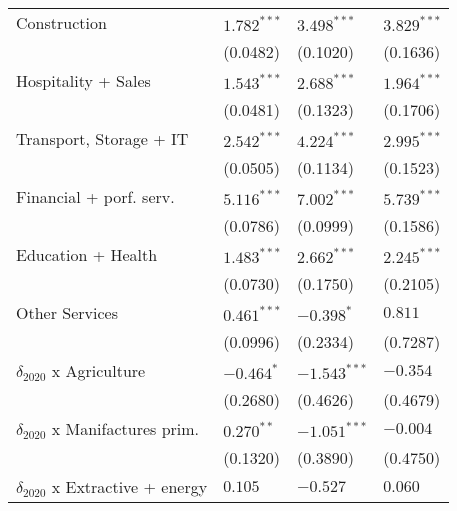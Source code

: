 \begin{tabular}{llll}
Construction                                       &      $1.782^{***}$ &      $3.498^{***}$ &      $3.829^{***}$ \\
                                                   &           (0.0482) &           (0.1020) &           (0.1636) \\
Hospitality + Sales                                &      $1.543^{***}$ &      $2.688^{***}$ &      $1.964^{***}$ \\
                                                   &           (0.0481) &           (0.1323) &           (0.1706) \\
Transport, Storage + IT                            &      $2.542^{***}$ &      $4.224^{***}$ &      $2.995^{***}$ \\
                                                   &           (0.0505) &           (0.1134) &           (0.1523) \\
Financial + porf. serv.                            &      $5.116^{***}$ &      $7.002^{***}$ &      $5.739^{***}$ \\
                                                   &           (0.0786) &           (0.0999) &           (0.1586) \\
Education + Health                                 &      $1.483^{***}$ &      $2.662^{***}$ &      $2.245^{***}$ \\
                                                   &           (0.0730) &           (0.1750) &           (0.2105) \\
Other Services                                     &      $0.461^{***}$ &         $-0.398^*$ &            $0.811$ \\
                                                   &           (0.0996) &           (0.2334) &           (0.7287) \\
$\delta_{2020}$ x Agriculture                      &         $-0.464^*$ &     $-1.543^{***}$ &           $-0.354$ \\
                                                   &           (0.2680) &           (0.4626) &           (0.4679) \\
$\delta_{2020}$ x Manifactures prim.               &       $0.270^{**}$ &     $-1.051^{***}$ &           $-0.004$ \\
                                                   &           (0.1320) &           (0.3890) &           (0.4750) \\
$\delta_{2020}$ x Extractive + energy              &            $0.105$ &           $-0.527$ &            $0.060$ \\

\end{tabular}
